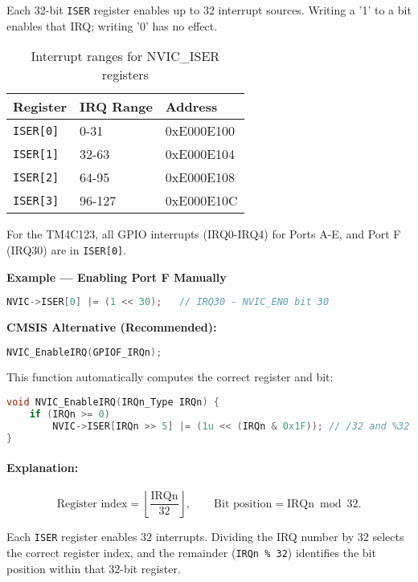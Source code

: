 \noindent
Each 32-bit \texttt{ISER} register enables up to 32 interrupt sources.  
Writing a '1' to a bit enables that IRQ; writing '0' has no effect.

\begin{table}[H]
\centering
\small
\renewcommand{\arraystretch}{1.1}
\begin{tabular}{lll}
\toprule
\textbf{Register} & \textbf{IRQ Range} & \textbf{Address} \\
\midrule
\texttt{ISER[0]} & 0-31  & 0xE000E100 \\
\texttt{ISER[1]} & 32-63 & 0xE000E104 \\
\texttt{ISER[2]} & 64-95 & 0xE000E108 \\
\texttt{ISER[3]} & 96-127 & 0xE000E10C \\
\bottomrule
\end{tabular}
\caption{Interrupt ranges for NVIC\_ISER registers}
\end{table}

\noindent
For the TM4C123, all GPIO interrupts (IRQ0-IRQ4) for Ports A-E, and Port F (IRQ30) are in \texttt{ISER[0]}.
\bigskip


\noindent
\textbf{Example — Enabling Port F Manually}
\begin{lstlisting}[caption={Enable GPIO Port F interrupt manually}, language=C]
NVIC->ISER[0] |= (1 << 30);   // IRQ30 - NVIC_EN0 bit 30
\end{lstlisting}

\noindent
\textbf{CMSIS Alternative (Recommended):}
\begin{lstlisting}[language=C]
NVIC_EnableIRQ(GPIOF_IRQn);
\end{lstlisting}

\noindent
This function automatically computes the correct register and bit:
\begin{lstlisting}[language=C]
void NVIC_EnableIRQ(IRQn_Type IRQn) {
    if (IRQn >= 0)
        NVIC->ISER[IRQn >> 5] |= (1u << (IRQn & 0x1F)); // /32 and %32
}
\end{lstlisting}
\noindent
\paragraph{Explanation:}
\[
\text{Register index} = \left\lfloor \frac{\text{IRQn}}{32} \right\rfloor, \qquad
\text{Bit position} = \text{IRQn} \bmod 32.
\]

\noindent
Each \texttt{ISER} register enables 32 interrupts.  
Dividing the IRQ number by 32 selects the correct register index, and the remainder (\texttt{IRQn \% 32}) identifies the bit position within that 32-bit register.
